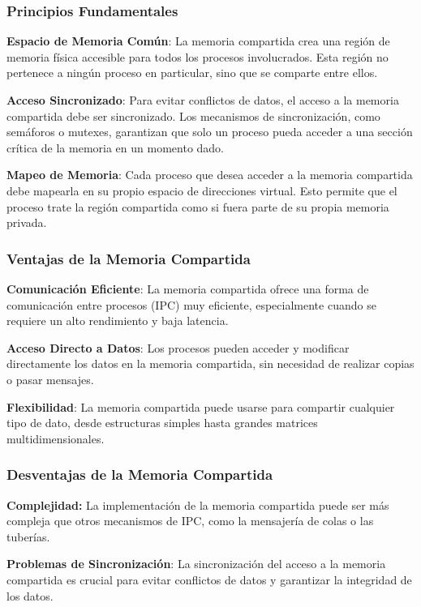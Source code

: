 \subsubsection{Principios Fundamentales}

\textbf{Espacio de Memoria Común}: La memoria compartida crea una región de memoria física accesible para todos los procesos involucrados. Esta región no pertenece a ningún proceso en particular, sino que se comparte entre ellos.

\textbf{Acceso Sincronizado}: Para evitar conflictos de datos, el acceso a la memoria compartida debe ser sincronizado. Los mecanismos de sincronización, como semáforos o mutexes, garantizan que solo un proceso pueda acceder a una sección crítica de la memoria en un momento dado.

\textbf{Mapeo de Memoria}: Cada proceso que desea acceder a la memoria compartida debe mapearla en su propio espacio de direcciones virtual. Esto permite que el proceso trate la región compartida como si fuera parte de su propia memoria privada.

\subsubsection{Ventajas de la Memoria Compartida}

\textbf{Comunicación Eficiente}: La memoria compartida ofrece una forma de comunicación entre procesos (IPC) muy eficiente, especialmente cuando se requiere un alto rendimiento y baja latencia.

\textbf{Acceso Directo a Datos}: Los procesos pueden acceder y modificar directamente los datos en la memoria compartida, sin necesidad de realizar copias o pasar mensajes.

\textbf{Flexibilidad}: La memoria compartida puede usarse para compartir cualquier tipo de dato, desde estructuras simples hasta grandes matrices multidimensionales.

\subsubsection{Desventajas de la Memoria Compartida}

\textbf{Complejidad:} La implementación de la memoria compartida puede ser más compleja que otros mecanismos de IPC, como la mensajería de colas o las tuberías.

\textbf{Problemas de Sincronización}: La sincronización del acceso a la memoria compartida es crucial para evitar conflictos de datos y garantizar la integridad de los datos.

